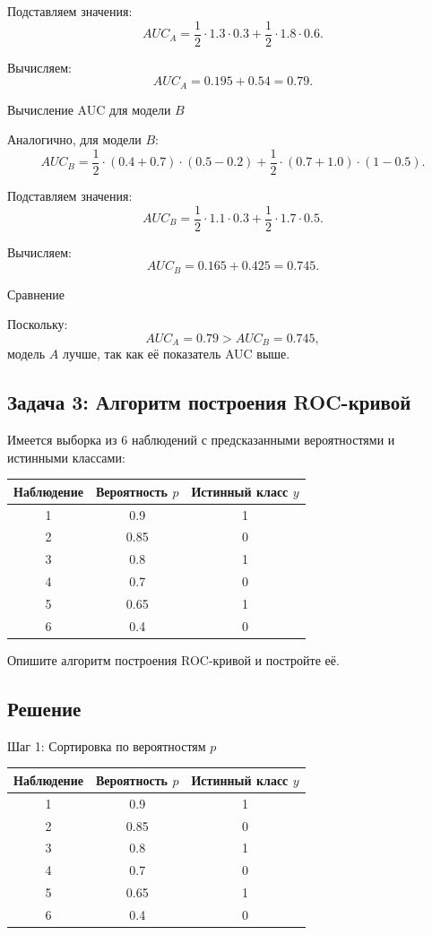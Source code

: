 Подставляем значения:
\[
AUC_A = \frac{1}{2} \cdot 1.3 \cdot 0.3 + \frac{1}{2} \cdot 1.8 \cdot 0.6.
\]

Вычисляем:
\[
AUC_A = 0.195 + 0.54 = 0.79.
\]

Вычисление AUC для модели \(B\)

Аналогично, для модели \(B\):
\[
AUC_B = \frac{1}{2} \cdot (0.4 + 0.7) \cdot (0.5 - 0.2) + \frac{1}{2} \cdot (0.7 + 1.0) \cdot (1 - 0.5).
\]

Подставляем значения:
\[
AUC_B = \frac{1}{2} \cdot 1.1 \cdot 0.3 + \frac{1}{2} \cdot 1.7 \cdot 0.5.
\]

Вычисляем:
\[
AUC_B = 0.165 + 0.425 = 0.745.
\]

Сравнение

Поскольку:
\[
AUC_A = 0.79 > AUC_B = 0.745,
\]
модель \(A\) лучше, так как её показатель AUC выше.

\subsection*{Задача 3: Алгоритм построения ROC-кривой}

Имеется выборка из 6 наблюдений с предсказанными вероятностями и истинными классами:

\begin{table}[h!]
\centering
\begin{tabular}{|c|c|c|}
\hline
\textbf{Наблюдение} & \textbf{Вероятность $p$} & \textbf{Истинный класс $y$} \\
\hline
1 & 0.9 & 1 \\
2 & 0.85 & 0 \\
3 & 0.8 & 1 \\
4 & 0.7 & 0 \\
5 & 0.65 & 1 \\
6 & 0.4 & 0 \\
\hline
\end{tabular}
\end{table}

Опишите алгоритм построения ROC-кривой и постройте её.

\subsection*{Решение}

Шаг 1: Сортировка по вероятностям $p$

\begin{table}[h!]
\centering
\begin{tabular}{|c|c|c|}
\hline
\textbf{Наблюдение} & \textbf{Вероятность $p$} & \textbf{Истинный класс $y$} \\
\hline
1 & 0.9 & 1 \\
2 & 0.85 & 0 \\
3 & 0.8 & 1 \\
4 & 0.7 & 0 \\
5 & 0.65 & 1 \\
6 & 0.4 & 0 \\
\hline
\end{tabular}
\end{table}

